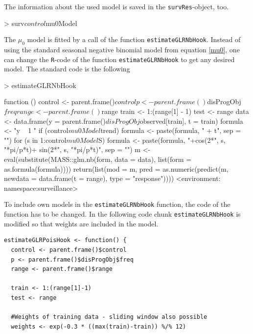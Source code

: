 \documentclass[a4paper,11pt]{article}
\begin{document}
\begin{itemize}
The information about the used model is saved in the \verb+survRes+-object, too. 

\begin{Schunk}
\begin{Sinput}
> surv$control$mu0Model
\end{Sinput}
\end{Schunk}

The $\mu_0$ model is fitted by a call of the function \verb+estimateGLRNbHook+. Instead of using the standard seasonal negative binomial model from equation \ref{mu0}, one can change the \texttt{R}-code of  the function \verb+estimateGLRNbHook+ to get any desired model. The standard code is the following

\begin{Schunk}
\begin{Sinput}
> estimateGLRNbHook
\end{Sinput}
\begin{Soutput}
function () 
{
    control <- parent.frame()$control
    p <- parent.frame()$disProgObj$freq
    range <- parent.frame()$range
    train <- 1:(range[1] - 1)
    test <- range
    data <- data.frame(y = parent.frame()$disProgObj$observed[train], 
        t = train)
    formula <- "y ~ 1 "
    if (control$mu0Model$trend) {
        formula <- paste(formula, " + t", sep = "")
    }
    for (s in 1:control$mu0Model$S) {
        formula <- paste(formula, "+cos(2*", s, "*pi/p*t)+ sin(2*", 
            s, "*pi/p*t)", sep = "")
    }
    m <- eval(substitute(MASS::glm.nb(form, data = data), list(form = as.formula(formula))))
    return(list(mod = m, pred = as.numeric(predict(m, newdata = data.frame(t = range), 
        type = "response"))))
}
<environment: namespace:surveillance>
\end{Soutput}
\end{Schunk}

To include own models in the \verb+estimateGLRNbHook+ function, the code of the function has to be changed. In the following code chunk \verb+estimateGLRNbHook+ is modified so that weights are included in the model.

\begin{small}
\begin{verbatim}
estimateGLRPoisHook <- function() {
  control <- parent.frame()$control
  p <- parent.frame()$disProgObj$freq
  range <- parent.frame()$range

  train <- 1:(range[1]-1)
  test <- range
  
  #Weights of training data - sliding window also possible
  weights <- exp(-0.3 * ((max(train)-train)) %/% 12)


\end{verbatim}
\end{small}
\end{itemize}
\end{document}
